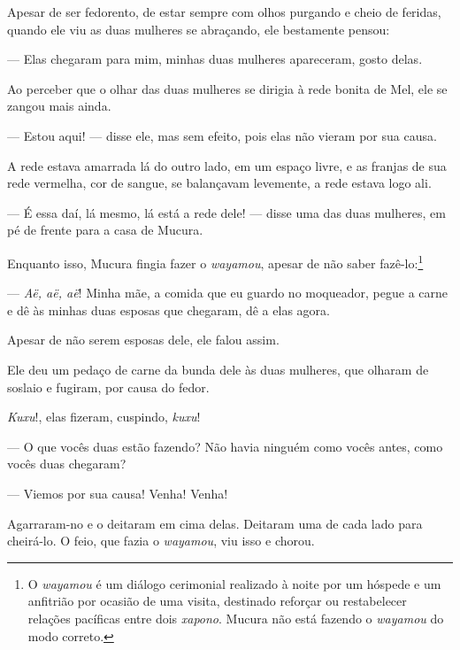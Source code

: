 Apesar de ser fedorento, de estar sempre com olhos purgando e cheio de
feridas, quando ele viu as duas mulheres se abraçando, ele bestamente
pensou:

--- Elas chegaram para mim, minhas duas mulheres apareceram, gosto
delas. 

Ao perceber que o olhar das duas mulheres se dirigia à rede bonita de
Mel, ele se zangou mais ainda. 

--- Estou aqui! --- disse ele, mas sem efeito, pois elas não vieram por
sua causa.

A rede estava amarrada lá do outro lado, em um espaço livre, e as
franjas de sua rede vermelha, cor de sangue, se balançavam levemente, a
rede estava logo ali. 

--- É essa daí, lá mesmo, lá está a rede dele! --- disse uma das duas
mulheres, em pé de frente para a casa de Mucura. 

Enquanto isso, Mucura fingia fazer o \textit{wayamou}, apesar de não saber
fazê-lo:\footnote{O \textit{wayamou} é um diálogo cerimonial realizado à noite por um hóspede e um anfitrião por ocasião de uma visita, destinado reforçar ou restabelecer relações pacíficas entre dois \textit{xapono}. Mucura não está fazendo o \textit{wayamou} do modo correto.} 

--- \textit{Aë, aë, aë}! Minha mãe, a comida que eu guardo no moqueador,
pegue a carne e dê às minhas duas esposas que chegaram, dê a elas
agora. 

Apesar de não serem esposas dele, ele falou assim. 

Ele deu um pedaço de carne da bunda dele às duas mulheres, que olharam
de soslaio e fugiram, por causa do fedor. 

\textit{Kuxu}!, elas fizeram, cuspindo, \textit{kuxu}!


--- O que vocês duas estão fazendo? Não havia ninguém como vocês antes,
como vocês duas chegaram?

--- Viemos por sua causa! Venha! Venha! 

Agarraram-no e o deitaram em cima delas. Deitaram uma de cada lado para
cheirá-lo. O feio, que fazia o \textit{wayamou}, viu isso e
chorou. 


